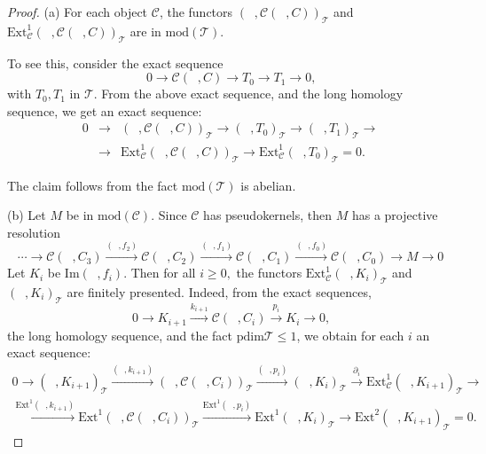 \documentclass{amsart}
\theoremstyle{plain}
\numberwithin{equation}{section}
\begin{document}
\begin{proof}
(a) For each object $\mathcal{C}$, the functors $(\;\;,\mathcal{C}(\;\;,C))_{\mathcal{T}}$ and $\mathrm{Ext}^{1}_{\mathcal{C}}(\;\;,\mathcal{C}(\;\;,C))_{\mathcal{T}}$ are in $\mathrm{mod}(\mathcal{T})$.

To see this, consider the exact sequence
\begin{equation*}
0\rightarrow \mathcal{C}(\;\;,C)\rightarrow T_{0}\rightarrow
T_{1}\rightarrow 0\text{,}
\end{equation*}with $T_{0},T_{1}$ in $\mathcal{T}$. From the above exact sequence, and the
long homology sequence, we get an exact sequence:
\begin{eqnarray*}
0 &\rightarrow &(\;\;,\mathcal{C}(\;\;,C))_{\mathcal{T}}\rightarrow
(\;\;,T_{0})_{\mathcal{T}}\rightarrow (\;\;,T_{1})_{\mathcal{T}}\rightarrow
\\
&\rightarrow &\mathrm{Ext}^{1}_{\mathcal{C}}(\;\;,\mathcal{C}(\;\;,C))_{\mathcal{T}}\rightarrow \mathrm{Ext}^{1}_{\mathcal{C}}(\;\;,T_{0})_{\mathcal{T}}=0\text{.}
\end{eqnarray*}

The claim follows from the fact $\mathrm{mod}(\mathcal{T})$ is abelian.

(b) Let $M$ be in $\mathrm{mod}(\mathcal{C})$. Since $\mathcal{C}$ has
pseudokernels, then $M$ has a projective resolution
\begin{equation*}
\cdots \rightarrow \mathcal{C}(\;\;,C_{3})\xrightarrow{(\;\;,f_2)}\mathcal{C}(\;\;,C_{2})\xrightarrow{(\;\;,f_1)}\mathcal{C}(\;\;,C_{1})\xrightarrow{(\;\;,f_0)}\mathcal{C}(\;\;,C_{0})\rightarrow M\rightarrow 0
\end{equation*}Let $K_{i}$ be $\mathrm{Im}(\;\;,f_{i})$. Then for all $i\geq 0,$ the
functors $\mathrm{Ext}^{1}_{\mathcal{C}}(\;\;,K_{i})_{\mathcal{T}}$ and $(\;\;,K_{i})_{\mathcal{T}}$ are finitely presented. Indeed, from the exact
sequences,
\begin{equation*}
0\rightarrow K_{i+1}\xrightarrow{k_{i+1}}\mathcal{C}(\;\;,C_{i})\xrightarrow{p_i}K_{i}\rightarrow 0\text{,}
\end{equation*}the long homology sequence, and the fact $\mathrm{pdim}\mathcal{T}\leq 1$,
we obtain for each $i$ an exact sequence:
\begin{eqnarray*}
0\rightarrow (\;\;,K_{i+1})_{\mathcal{T}}\xrightarrow{(\;\;,k_{i+1})}(\;\;,\mathcal{C}(\;\;,C_{i}))_{\mathcal{T}}\xrightarrow{(\;\;,p_i)}(\;\;,K_{i})_{\mathcal{T}}\xrightarrow{\partial_i}\mathrm{Ext}_{\mathcal{C}}^{1}(\;\;,K_{i+1})_{\mathcal{T}}\rightarrow && \\
\xrightarrow{\mathrm{Ext}^1(\;\;,k_{i+1})}\mathrm{Ext}^{1}(\;\;,\mathcal{C}(\;\;,C_{i}))_{\mathcal{T}}\xrightarrow{\mathrm{Ext}^1(\;\;,p_{i})}\mathrm{Ext}^{1}(\;\;,K_{i})_{\mathcal{T}}\rightarrow \mathrm{Ext}^{2}(\;\;,K_{i+1})_{\mathcal{T}}=0\text{.} &&
\end{eqnarray*}


\end{proof}
\end{document}

